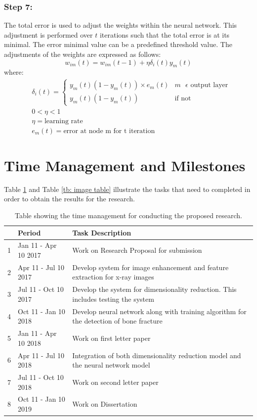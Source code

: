 \documentclass[11pt,twocolumn]{witseiepaper}
\begin{document}
	\subsubsection{Step 7:}
	The total error is used to adjust the weights within the neural network. This adjustment is performed over $t$ iterations such that the total error is at its minimal. The error minimal value can be a predefined threshold value. The adjustments of the weights are expressed as follows:
	\begin{equation}
		w_{im}(t) = w_{im}(t-1)+\eta\delta_i(t)y_m(t)
	\end{equation}
	where:
	\begin{align*}
		& \delta_i(t) = 
		\begin{cases}
			y_m(t)(1 - y_m(t))\times e_m(t) & m \text{ } \epsilon \text{ output layer}\\
			y_m(t)(1 - y_m(t)) & \text{if not}
		\end{cases} \\
		& 0 < \eta < 1 \\
		& \eta = \text{learning rate} \\
		& e_m(t) = \text{error at node m for t iteration}
	\end{align*}
	
	\section{Time Management and Milestones}
	\label{sc: Time Management and Milestones}
	Table \ref{time_management} and Table \ref{tb: image table} illustrate the tasks that need to completed in order to obtain the results for the research.
	\begin{table}[!h]
		\centering
		\caption{Table showing the time management for conducting the proposed research.}
		\label{time_management}
		\begin{tabular}{| c | p{2.5cm} | p{4.5cm} |}
			\hline
			& Period & Task Description \\
			\hline \hline
			1 & Jan 11 - Apr 10 2017 & Work on Research Proposal for submission\\
			\hline
			2 & Apr 11 - Jul 10 2017 & Develop system for image enhancement and feature extraction for x-ray images \\
			\hline
			3 & Jul 11 - Oct 10 2017 &  Develop the system for dimensionality reduction. This includes testing the system\\
			\hline
			4 & Oct 11 - Jan 10 2018 & Develop neural network along with training algorithm for the detection of bone fracture \\
			\hline
			5 & Jan 11 - Apr 10 2018 & Work on first letter paper \\
			\hline
			6 & Apr 11 - Jul 10 2018 & Integration of both dimensionality reduction model and the neural network model \\
			\hline
			7 & Jul 11 - Oct 10 2018 & Work on second letter paper\\
			\hline
			8 & Oct 11 - Jan 10 2019 & Work on Dissertation \\
			\hline
		\end{tabular}
	\end{table}
	
\end{document}
